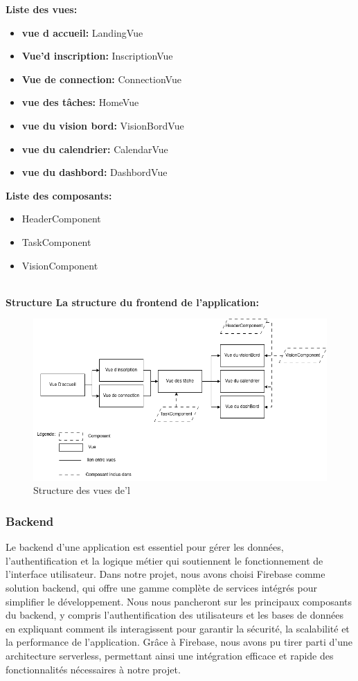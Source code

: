 \documentclass[a4paper,12pt]{report}
\begin{document}
\textbf{Liste des vues:}
\begin{itemize}
    \item\textbf{vue d accueil:} LandingVue
    \item\textbf{ Vue'd inscription:} InscriptionVue
    \item\textbf{ Vue de connection:} ConnectionVue
    \item\textbf{ vue des tâches:} HomeVue
    \item\textbf{ vue du vision bord:} VisionBordVue
    \item\textbf{ vue du calendrier:} CalendarVue
    \item\textbf{ vue du dashbord:} DashbordVue
\end{itemize}
    
\textbf{Liste des composants:}
   \begin{itemize}
    \item HeaderComponent
    \item TaskComponent
    \item VisionComponent\\ \\
   \end{itemize}
    
\textbf{Structure La structure du frontend de l'application:} 
  \begin{figure}[h!]
      \includegraphics[width=1\textwidth]{./images/getdo_structure_vue.drawio.png}
      \caption{Structure des vues de'l}
      \label{fig:GETDO_UseCaseDiagramm}
  \end{figure}

\subsubsection{Backend}
Le backend d'une application est essentiel pour gérer les données, l'authentification et la logique métier qui soutiennent le fonctionnement de l'interface utilisateur. Dans notre projet, nous avons choisi Firebase comme solution backend, qui offre une gamme complète de services intégrés pour simplifier le développement. Nous nous pancheront sur les principaux composants du backend, y compris l'authentification des utilisateurs et les bases de données en expliquant comment ils interagissent pour garantir la sécurité, la scalabilité et la performance de l'application. Grâce à Firebase, nous avons pu tirer parti d'une architecture serverless, permettant ainsi une intégration efficace et rapide des fonctionnalités nécessaires à notre projet.
\end{document}

